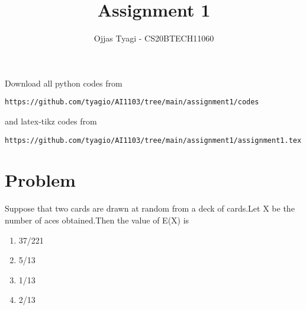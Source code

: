 \documentclass[journal,12pt,twocolumn]{IEEEtran}
\begin{document}
\providecommand{\fourier}{\overset{\mathcal{F}}{ \rightleftharpoons}}
\providecommand{\system}{\overset{\mathcal{H}}{ \longleftrightarrow}}
\newcommand{\solution}{\noindent \textbf{Solution: }}
\newcommand{\cosec}{\,\text{cosec}\,}
\providecommand{\dec}[2]{\ensuremath{\overset{#1}{\underset{#2}{\gtrless}}}}
\newcommand{\myvec}[1]{\ensuremath{\begin{pmatrix}#1\end{pmatrix}}}
\newcommand{\mydet}[1]{\ensuremath{\begin{vmatrix}#1\end{vmatrix}}}
\makeatletter
{}
\makeatother
\let\StandardTheFigure\thefigure
\let\vec\mathbf
\renewcommand{\thefigure}{\theproblem}
\def\putbox#1#2#3{\makebox[0in][l]{\makebox[#1][l]{}\raisebox{\baselineskip}[0in][0in]{\raisebox{#2}[0in][0in]{#3}}}}
     \def\rightbox#1{\makebox[0in][r]{#1}}
     \def\centbox#1{\makebox[0in]{#1}}
     \def\topbox#1{\raisebox{-\baselineskip}[0in][0in]{#1}}
     \def\midbox#1{\raisebox{-0.5\baselineskip}[0in][0in]{#1}}
\vspace{3cm}
\title{Assignment 1}
\author{Ojjas Tyagi - CS20BTECH11060}
\maketitle
\newpage
\bigskip
\renewcommand{\thefigure}{\theenumi}
\renewcommand{\thetable}{\theenumi}
Download all python codes from 
\begin{lstlisting}
https://github.com/tyagio/AI1103/tree/main/assignment1/codes
\end{lstlisting}
%
and latex-tikz codes from 
%
\begin{lstlisting}
https://github.com/tyagio/AI1103/tree/main/assignment1/assignment1.tex
\end{lstlisting}
\section{Problem}
Suppose that two cards are drawn at random from a deck of cards.Let X be the number of aces obtained.Then the value of E(X) is 
\begin{enumerate}
    \item 37/221
    \item 5/13
    \item 1/13
    \item 2/13
\end{enumerate}
\end{document}
